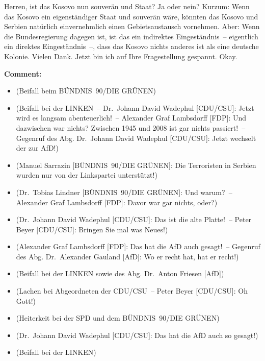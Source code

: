 \documentclass{article}
\begin{document}
Herren, ist das Kosovo nun souverän und Staat? Ja oder nein? Kurzum: Wenn das Kosovo ein eigenständiger Staat und souverän wäre, könnten das Kosovo und Serbien natürlich einvernehmlich einen Gebietsaustausch vornehmen. Aber: Wenn die Bundesregierung dagegen ist, ist das ein indirektes Eingeständnis – eigentlich ein direktes Eingeständnis –, dass das Kosovo nichts anderes ist als eine deutsche Kolonie. Vielen Dank.  Jetzt bin ich auf Ihre Fragestellung gespannt. Okay.  

\noindent\textbf{Comment:}
\begin{itemize}
    \setlength\itemsep{-3pt}
    \item (Beifall beim BÜNDNIS 90/DIE GRÜNEN)
    \setlength\itemsep{-3pt}
    \item (Beifall bei der LINKEN – Dr. Johann David Wadephul [CDU/CSU]: Jetzt wird es langsam abenteuerlich! – Alexander Graf Lambsdorff [FDP]: Und dazwischen war nichts? Zwischen 1945 und 2008 ist gar nichts passiert! – Gegenruf des Abg. Dr. Johann David Wadephul [CDU/CSU]: Jetzt wechselt der zur AfD!)
    \setlength\itemsep{-3pt}
    \item (Manuel Sarrazin [BÜNDNIS 90/DIE GRÜNEN]: Die Terroristen in Serbien wurden nur von der Linkspartei unterstützt!)
    \setlength\itemsep{-3pt}
    \item (Dr. Tobias Lindner [BÜNDNIS 90/DIE GRÜNEN]: Und warum? – Alexander Graf Lambsdorff [FDP]: Davor war gar nichts, oder?)
    \setlength\itemsep{-3pt}
    \item (Dr. Johann David Wadephul [CDU/CSU]: Das ist die alte Platte! – Peter Beyer [CDU/CSU]: Bringen Sie mal was Neues!)
    \setlength\itemsep{-3pt}
    \item (Alexander Graf Lambsdorff [FDP]: Das hat die AfD auch gesagt! – Gegenruf des Abg. Dr. Alexander Gauland [AfD]: Wo er recht hat, hat er recht!)
    \setlength\itemsep{-3pt}
    \item (Beifall bei der LINKEN sowie des Abg. Dr. Anton Friesen [AfD])
    \setlength\itemsep{-3pt}
    \item (Lachen bei Abgeordneten der CDU/CSU – Peter Beyer [CDU/CSU]: Oh Gott!)
    \setlength\itemsep{-3pt}
    \item (Heiterkeit bei der SPD und dem BÜNDNIS 90/DIE GRÜNEN)
    \setlength\itemsep{-3pt}
    \item (Dr. Johann David Wadephul [CDU/CSU]: Das hat die AfD auch so gesagt!)
    \setlength\itemsep{-3pt}
    \item (Beifall bei der LINKEN)
\end{itemize}
\end{document}
